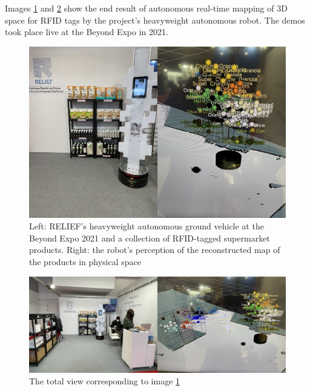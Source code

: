 \begin{minipage}[t][\textheight]{\textwidth}
Images \ref{fig:relief_beyond_1} and \ref{fig:relief_beyond_2} show the end
result of autonomous real-time mapping of 3D space for RFID tags by the
project's heavyweight autonomous robot. The demos took place live at the Beyond
Expo in 2021.

\vfill

\begin{figure}[H]\centering
  \includegraphics[scale=0.4]{images/relief_1.png}
  \caption{\small Left: RELIEF's heavyweight autonomous ground vehicle at the
           Beyond Expo 2021 and a collection of RFID-tagged supermarket
           products. Right: the robot's perception of the reconstructed map of
           the products in physical space}
  \label{fig:relief_beyond_1}
\end{figure}

\vfill

\begin{figure}[H]\centering
  \includegraphics[scale=0.4]{images/relief_2.png}
  \caption{\small The total view corresponding to image \ref{fig:relief_beyond_1}}
  \label{fig:relief_beyond_2}
\end{figure}
\end{minipage}


